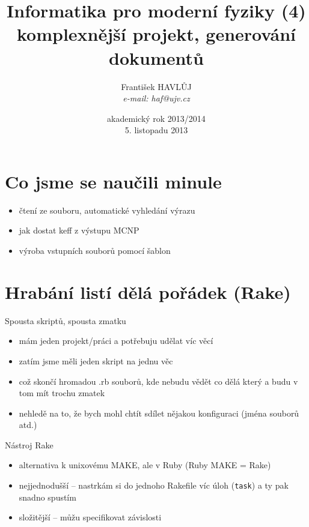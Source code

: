 \documentclass{beamer}
\title[IMF (4)]{Informatika pro moderní fyziky (4)\\komplexnější projekt, generování dokumentů}
\author[Franti\v{s}ek HAVL\r{U}J, ORF ÚJV Řež]{Franti\v{s}ek HAVL\r{U}J\\{\scriptsize \emph{e-mail: haf@ujv.cz}}}
\date{akademický rok 2013/2014\\5. listopadu 2013}
\institute[ORF ÚJV Řež]
{ÚJV Řež\\oddělení Reaktorové fyziky a podpory palivového cyklu}
\begin{document}
\begin{frame}
  \titlepage
\end{frame}

\begin{frame}
  \tableofcontents
\end{frame}

\section{Co jsme se naučili minule}

\begin{frame}{}
  \begin{itemize}
    \item čtení ze souboru, automatické vyhledání výrazu
    \item jak dostat keff z výstupu MCNP
    \item výroba vstupních souborů pomocí šablon
  \end{itemize}
\end{frame}

\section{Hrabání listí dělá pořádek (Rake)}

\begin{frame}{Spousta skriptů, spousta zmatku}
  \begin{itemize}
    \item mám jeden projekt/práci a potřebuju udělat víc věcí
    \item zatím jsme měli jeden skript na jednu věc
    \item což skončí hromadou .rb souborů, kde nebudu vědět co dělá který a budu v tom mít trochu zmatek
    \item nehledě na to, že bych mohl chtít sdílet nějakou konfiguraci (jména souborů atd.)
  \end{itemize}
\end{frame}

\begin{frame}{Nástroj Rake}
  \begin{itemize}
    \item alternativa k unixovému MAKE, ale v Ruby (Ruby MAKE = Rake)
    \item nejjednodušší -- nastrkám si do jednoho Rakefile víc úloh (\texttt{task}) a ty pak snadno spustím
    \item složitější -- můžu specifikovat závislosti
  \end{itemize}
\end{frame}
\end{document}
